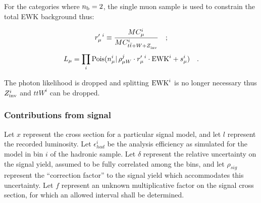 %
\newcommand{\rpi}{\ensuremath{r_{\mu}^{\prime\ i}}\xspace}

For the categories where $n_{\text{b}}=2$, the single muon sample is used to constrain the
total EWK background thus:

\begin{equation}
\rpi \equiv \frac{MC_{\mu}^i}{MC_{t\bar{t}+W+\zInv{}}^i}\quad ;
\end{equation}
\begin{equation}
\label{eq:muonLikelihoodTotalEwk}
L_{\mu}=\prod_i \mathrm{Pois}(n_{\mu}^i |\, \rho_{\mu W}^j \cdot
\rpi \cdot \ewk^{i} + s_{\mu}^i)\quad .
\end{equation}

The photon likelihood is dropped and splitting $\mathrm{EWK}^i$ is no longer
necessary thus $Z_{\rm inv}^{i}$ and $ttW^{i}$ can be dropped. 

\subsubsection{Contributions from signal}
\label{sec:signalContrib}

Let $x$ represent the cross section for a particular signal model, and
let $l$ represent the recorded luminosity.  Let $\epsilon^{i}_{had}$ 
be the analysis efficiency as simulated for the model in \HT bin $i$ 
of the hadronic sample.  Let $\delta$ represent the relative uncertainty on
the signal yield, assumed to be fully correlated among the bins, and
let $\rho_{sig}$ represent the ``correction factor'' to the signal
yield which accommodates this uncertainty.  Let $f$ represent an
unknown multiplicative factor on the signal cross section, for which
an allowed interval shall be determined.

